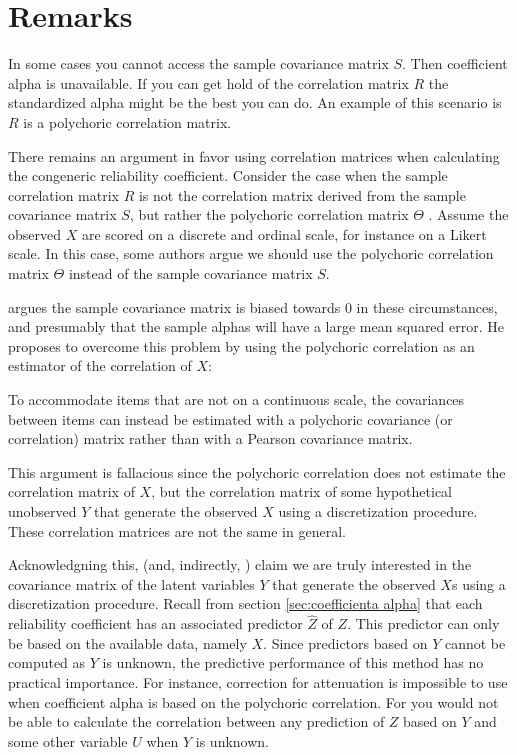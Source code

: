 \documentclass{article}
\theoremstyle{plain}
\theoremstyle{plain}
\theoremstyle{definition}
\theoremstyle{remark}
\theoremstyle{definition}
\theoremstyle{plain}
\theoremstyle{plain}
\theoremstyle{definition}
\begin{document}
\section{Remarks}
\label{sec:remarks}
In some cases you cannot access the sample covariance matrix $S$. Then coefficient alpha is unavailable. If you can get hold of the correlation matrix $R$ the standardized alpha might be the best you can do. An example of this scenario is $R$ is a polychoric correlation matrix.

There remains an argument in favor using correlation matrices when calculating the congeneric reliability coefficient. Consider the case when the sample correlation matrix $R$ is not the correlation matrix derived from the sample covariance matrix $S$, but rather the polychoric correlation matrix $\Theta$ \citep{Olsson1979-ti}. Assume the observed $X$ are scored on a discrete and ordinal scale, for instance on a Likert scale. In this case, some authors argue we should use the polychoric correlation matrix $\Theta$ instead of the sample covariance matrix $S$. 

\citet[][p. 415]{McNeish2018-vu} argues the sample covariance matrix is biased towards $0$ in these circumstances, and presumably that the sample alphas will have a large mean squared error. He proposes to overcome this problem by using the polychoric correlation as an estimator of the correlation of $X$:
\begin{displayquote}To accommodate items that are not on a continuous scale, the
covariances between items can instead be estimated with a polychoric covariance (or correlation) matrix rather than with a Pearson covariance matrix.
\end{displayquote}
This argument is fallacious since the polychoric correlation does not estimate the correlation matrix of $X$, but the correlation matrix of some hypothetical unobserved $Y$ that generate the observed $X$ using a discretization procedure. These correlation matrices are not the same in general. 

Acknowledgning this, \citet[][p.2]{Gadermann2012-jl} (and, indirectly, \citet{Zumbo2007-ap}) claim we are truly interested in the covariance matrix of the latent variables $Y$ that generate the observed $X$s using a discretization procedure. Recall from section \ref{sec:coefficienta alpha} that each reliability coefficient has an associated predictor $\widehat{Z}$ of $Z$. This predictor can only be based on the available data, namely $X$. Since predictors based on $Y$ cannot be computed as $Y$ is unknown, the predictive performance of this method has no practical importance. For instance, correction for attenuation is impossible to use when coefficient alpha is based on the polychoric correlation. For you would not be able to calculate the correlation between any prediction of $Z$ based on $Y$ and some other variable $U$ when $Y$ is unknown.
\end{document}
